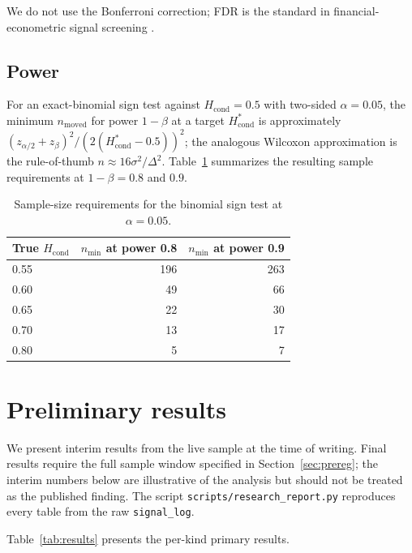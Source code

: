 \documentclass[review,12pt,authoryear]{elsarticle}
\begin{document}
We do not use the Bonferroni correction; FDR is the standard in
financial-econometric signal screening
\citep{HarveyLiuZhu2016}.

\subsection{Power}

For an exact-binomial sign test against \(H_\text{cond} = 0.5\) with
two-sided \(\alpha = 0.05\), the minimum \(n_\text{moved}\) for power
\(1-\beta\) at a target \(H_\text{cond}^*\) is approximately
\((z_{\alpha/2} + z_\beta)^2 / (2(H_\text{cond}^* - 0.5))^2\); the
analogous Wilcoxon approximation is the \citet{Lehr1992} rule-of-thumb
\(n \approx 16 \sigma^2 / \Delta^2\). Table~\ref{tab:power} summarizes the
resulting sample requirements at \(1-\beta = 0.8\) and \(0.9\).

\begin{table}[t]
\centering
\caption{Sample-size requirements for the binomial sign test at \(\alpha = 0.05\).}
\label{tab:power}
\small
\begin{tabular}{lrr}
\toprule
True \(H_\text{cond}\) & \(n_\text{min}\) at power 0.8 & \(n_\text{min}\) at power 0.9 \\
\midrule
0.55 & 196 & 263 \\
0.60 &  49 &  66 \\
0.65 &  22 &  30 \\
0.70 &  13 &  17 \\
0.80 &   5 &   7 \\
\bottomrule
\end{tabular}
\end{table}

\section{Preliminary results}
\label{sec:results}

We present interim results from the live sample at the time of writing.
Final results require the full sample window specified in
Section~\ref{sec:prereg}; the interim numbers below are illustrative of
the analysis but should not be treated as the published finding. The
script \texttt{scripts/research\_report.py} reproduces every table from
the raw \texttt{signal\_log}.

Table~\ref{tab:results} presents the per-kind primary results.
\end{document}

